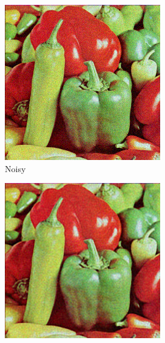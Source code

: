 \documentclass[12pt]{article}
\begin{document}
\begin{figure}[h]
  \centering
  \begin{subfigure}[b]{0.3\linewidth}
    \includegraphics[width=\linewidth]{2ds_noisy.png}
    \caption{Noisy}
  \end{subfigure}
  \begin{subfigure}[b]{0.3\linewidth}
    \includegraphics[width=\linewidth]{2ds_result.png}

\end{subfigure}
\end{figure}
\end{document}
